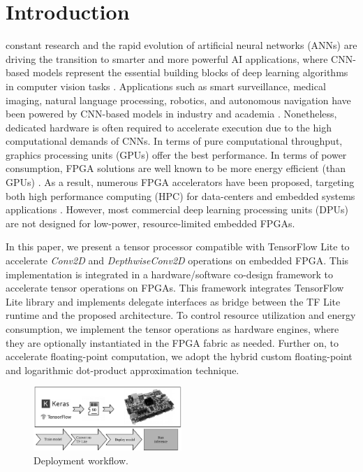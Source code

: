 
\section{Introduction}
\label{sec:introduction}
 constant research and the rapid evolution of artificial neural networks (ANNs) are driving the transition to smarter and more powerful AI applications, where CNN-based models represent the essential building blocks of deep learning algorithms in computer vision tasks \cite{hassaballah2020deep}. Applications such as smart surveillance, medical imaging, natural language processing, robotics, and autonomous navigation have been powered by CNN-based models in industry and academia \cite{dhillon2020convolutional}. Nonetheless, dedicated hardware is often required to accelerate execution due to the high computational demands of CNNs. In terms of pure computational throughput, graphics processing units (GPUs) offer the best performance. In terms of power consumption, FPGA solutions are well known to be more energy efficient (than GPUs) \cite{nurvitadhi2017can}. As a result, numerous FPGA accelerators have been proposed, targeting both high performance computing (HPC) for data-centers and embedded systems applications \cite{abdelouahab2018accelerating, moini2017resource, guo2017angel}. However, most commercial deep learning processing units (DPUs) are not designed for low-power, resource-limited embedded FPGAs.

In this paper, we present a tensor processor compatible with TensorFlow Lite to accelerate \emph{Conv2D} and \emph{DepthwiseConv2D} operations on embedded FPGA. This implementation is integrated in a hardware/software co-design framework to accelerate tensor operations on FPGAs. This framework integrates TensorFlow Lite library and implements delegate interfaces\cite{TensorFlowDelegate} as bridge between the TF Lite runtime and the proposed architecture. To control resource utilization and energy consumption, we implement the tensor operations as hardware engines, where they are optionally instantiated in the FPGA fabric as needed. Further on, to accelerate floating-point computation, we adopt the hybrid custom floating-point and logarithmic dot-product approximation technique\cite{nevarez2021accelerating}.

\begin{figure}[t!]
	\centering
	\includegraphics[width=0.5\textwidth]{../figures/workflow.pdf}
	\caption{Deployment workflow.}
	\label{fig:workflow}
\end{figure}

